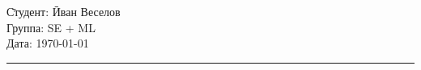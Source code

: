 \begin{tabbing}
\hspace{11cm} \= Студент: \= Иван Веселов \\
  \> Группа: \> SE + ML \\
  \> Дата: \> \today
\end{tabbing}
\hrule
\vspace{1cm}

